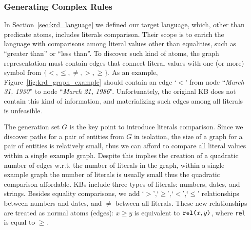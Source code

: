 %
\vspace{-1.5ex}
\subsubsection*{Generating Complex Rules}


\vspace{0.5ex}
In Section~\ref{sec:krd_language} we defined our target language, which, other than predicate atoms, includes literals comparison. 
Their scope is to enrich the language with comparisons among literal values other than equalities, such as ``greater than'' or ``less than''. To discover such kind of atoms, the graph representation must contain edges that connect literal values with one (or more) symbol from $\{<,\leq,\neq,>,\geq\}$. As an example, Figure~\ref{fig:krd_graph_example} should contain an edge `$<$' from node ``\textit{March 31, 1930}'' to node ``\textit{March 21, 1986}". Unfortunately, the original KB does not contain this kind of information, and materializing such edges among all literals is unfeasible.

The generation set $G$ is the key point to introduce literals comparison.
Since we discover paths for a pair of entities from $G$ in isolation, the size of a graph for a pair of entities is relatively small, thus we can afford to compare all literal values within a single example graph. Despite this implies the creation of a quadratic number of edges w.r.t. the number of literals in the graph, within a single example graph the number of literals is usually small thus the quadratic comparison affordable. 
KBs include three types of literals: numbers, dates, and strings. Besides equality comparisons, we add `$>$',`$\geq$',`$<$',`$\leq$' relationships between numbers and dates, and $\neq$ between all literals. These new relationships are treated as normal atoms (edges): $x \geq y$ is equivalent to $\texttt{rel(}x,y\texttt{)}$, where \texttt{rel} is equal to $\geq$. 

